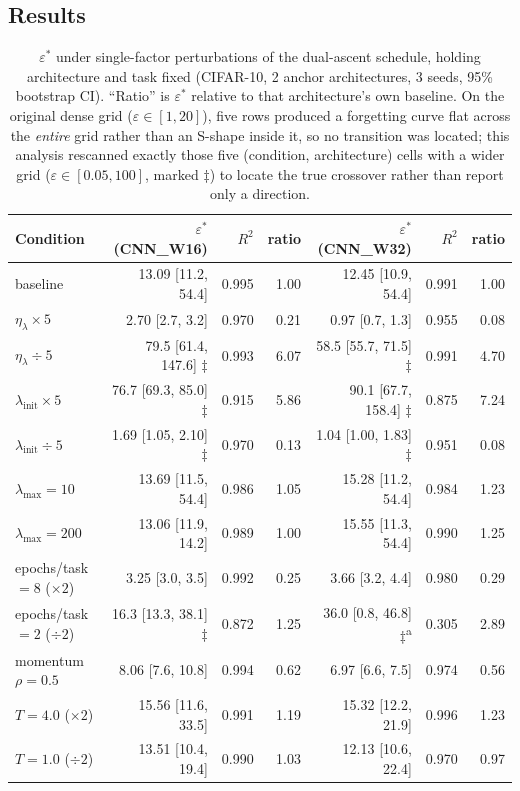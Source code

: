 \documentclass[11pt]{article}
\newcommand{\eps}{\varepsilon}
\newcommand{\epsstar}{\eps^{*}}
\begin{document}
\subsection{Results}
\begin{table}[h]
\centering
\caption{$\epsstar$ under single-factor perturbations of the dual-ascent
schedule, holding architecture and task fixed (CIFAR-10, 2 anchor
architectures, 3 seeds, 95\% bootstrap CI). ``Ratio'' is $\epsstar$ relative
to that architecture's own baseline. On the original dense grid
($\eps\in[1,20]$), five rows produced a forgetting curve flat across the
\emph{entire} grid rather than an S-shape inside it, so no transition was
located; this analysis rescanned exactly those five (condition, architecture) cells
with a wider grid ($\eps\in[0.05,100]$, marked $\ddagger$) to locate the
true crossover rather than report only a direction.}
\label{tab:diagnostic}
\footnotesize
\begin{tabular}{lrrrrrr}
\toprule
Condition & $\epsstar$ (CNN\_W16) & $R^2$ & ratio & $\epsstar$ (CNN\_W32) & $R^2$ & ratio \\
\midrule
baseline                        & 13.09 [11.2, 54.4] & 0.995 & 1.00 & 12.45 [10.9, 54.4] & 0.991 & 1.00 \\
$\eta_\lambda \times 5$          & 2.70 [2.7, 3.2]     & 0.970 & 0.21 & 0.97 [0.7, 1.3]     & 0.955 & 0.08 \\
$\eta_\lambda \div 5$            & 79.5 [61.4, 147.6] $\ddagger$ & 0.993 & 6.07 & 58.5 [55.7, 71.5] $\ddagger$ & 0.991 & 4.70 \\
$\lambda_{\mathrm{init}} \times 5$ & 76.7 [69.3, 85.0] $\ddagger$ & 0.915 & 5.86 & 90.1 [67.7, 158.4] $\ddagger$ & 0.875 & 7.24 \\
$\lambda_{\mathrm{init}} \div 5$   & 1.69 [1.05, 2.10] $\ddagger$ & 0.970 & 0.13 & 1.04 [1.00, 1.83] $\ddagger$ & 0.951 & 0.08 \\
$\lambda_{\max}=10$              & 13.69 [11.5, 54.4] & 0.986 & 1.05 & 15.28 [11.2, 54.4] & 0.984 & 1.23 \\
$\lambda_{\max}=200$             & 13.06 [11.9, 14.2] & 0.989 & 1.00 & 15.55 [11.3, 54.4] & 0.990 & 1.25 \\
epochs/task $=8$ ($\times 2$)    & 3.25 [3.0, 3.5]     & 0.992 & 0.25 & 3.66 [3.2, 4.4]     & 0.980 & 0.29 \\
epochs/task $=2$ ($\div 2$)      & 16.3 [13.3, 38.1] $\ddagger$ & 0.872 & 1.25 & 36.0 [0.8, 46.8] $\ddagger$\textsuperscript{a} & 0.305 & 2.89 \\
momentum $\rho=0.5$              & 8.06 [7.6, 10.8]    & 0.994 & 0.62 & 6.97 [6.6, 7.5]     & 0.974 & 0.56 \\
$T=4.0$ ($\times 2$)             & 15.56 [11.6, 33.5] & 0.991 & 1.19 & 15.32 [12.2, 21.9] & 0.996 & 1.23 \\
$T=1.0$ ($\div 2$)               & 13.51 [10.4, 19.4] & 0.990 & 1.03 & 12.13 [10.6, 22.4] & 0.970 & 0.97 \\
\bottomrule
\end{tabular}


\end{table}
\end{document}
